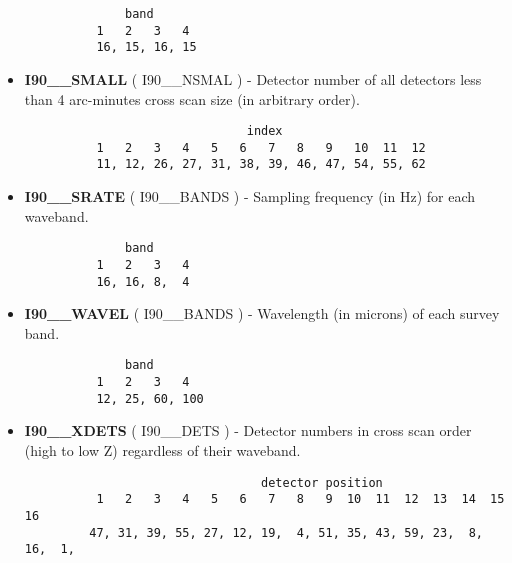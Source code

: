 \begin{itemize}
\begin{minipage}[t]{\textwidth}
\small
\begin{verbatim}
              band
          1   2   3   4
          16, 15, 16, 15
\end{verbatim}
\normalsize
\end{minipage}

\item {\bf I90\_\_SMALL} ( I90\_\_NSMAL ) - Detector number of all detectors less than 4 
arc-minutes cross scan size (in arbitrary order).

\begin{minipage}[t]{\textwidth}
\small
\begin{verbatim}
                               index                           
          1   2   3   4   5   6   7   8   9   10  11  12 
          11, 12, 26, 27, 31, 38, 39, 46, 47, 54, 55, 62 
\end{verbatim}
\normalsize
\end{minipage}

\item {\bf I90\_\_SRATE} ( I90\_\_BANDS ) - Sampling frequency (in Hz) for
each waveband. 

\begin{minipage}[t]{\textwidth}
\small
\begin{verbatim}
              band
          1   2   3   4   
          16, 16, 8,  4
\end{verbatim}
\normalsize
\end{minipage}

\item {\bf I90\_\_WAVEL} ( I90\_\_BANDS ) - Wavelength (in microns) of
each survey band.

\begin{minipage}[t]{\textwidth}
\small
\begin{verbatim}
              band
          1   2   3   4   
          12, 25, 60, 100
\end{verbatim}
\normalsize
\end{minipage}

\item {\bf I90\_\_XDETS} ( I90\_\_DETS ) - Detector numbers in cross scan order
(high to low Z) regardless of their waveband.

\begin{minipage}[t]{\textwidth}
\small
\begin{verbatim}
                                 detector position
          1   2   3   4   5   6   7   8   9  10  11  12  13  14  15  16
         47, 31, 39, 55, 27, 12, 19,  4, 51, 35, 43, 59, 23,  8, 16,  1,


\end{verbatim}
\end{minipage}
\end{itemize}
